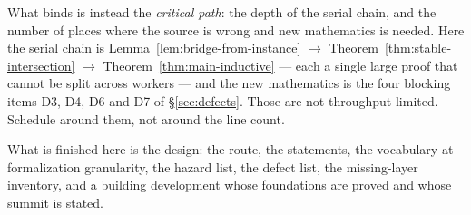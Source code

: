 What binds is instead the \emph{critical path}: the depth of the serial chain,
and the number of places where the source is wrong and new mathematics is
needed. Here the serial chain is
Lemma~\ref{lem:bridge-from-instance} $\to$
Theorem~\ref{thm:stable-intersection} $\to$
Theorem~\ref{thm:main-inductive} --- each a single large proof that cannot be
split across workers --- and the new mathematics is the four blocking items
D3, D4, D6 and D7 of \S\ref{sec:defects}. Those are not throughput-limited.
Schedule around them, not around the line count.

What is finished here is the design: the route, the statements, the vocabulary
at formalization granularity, the hazard list, the defect list, the
missing-layer inventory, and a building development whose foundations are proved
and whose summit is stated.
